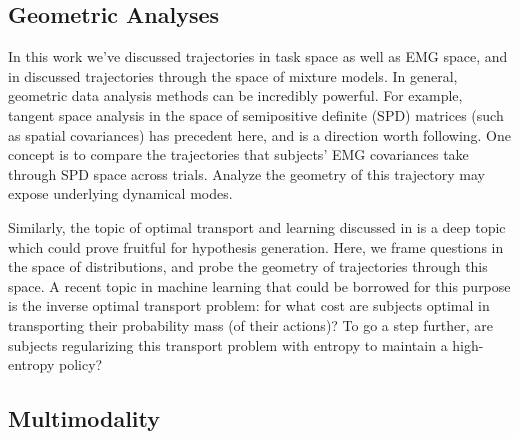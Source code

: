 \documentclass[../main.tex]{subfiles}
\begin{document}




\subsection{Geometric Analyses}

In this work we've discussed trajectories in task space as well as EMG space, and in  discussed trajectories through the space of mixture models. In general, geometric data analysis methods can be incredibly powerful. For example, tangent space analysis in the space of semipositive definite (SPD) matrices (such as spatial covariances) has precedent here, and is a direction worth following. One concept is to compare the trajectories that subjects' EMG covariances take through SPD space across trials. Analyze the geometry of this trajectory may expose underlying dynamical modes\cite{barachantCommonSpatialPattern2010,barachantClassificationCovarianceMatrices2013}.

Similarly, the topic of optimal transport and learning discussed in  is a deep topic which could prove fruitful for hypothesis generation. Here, we frame questions in the space of distributions, and probe the geometry of trajectories through this space. A recent topic in machine learning that could be borrowed for this purpose is the inverse optimal transport problem: for what cost are subjects optimal in transporting their probability mass (of their actions)? To go a step further, are subjects regularizing this transport problem with entropy to maintain a high-entropy policy?










 



\subsection{Multimodality}
\end{document}
